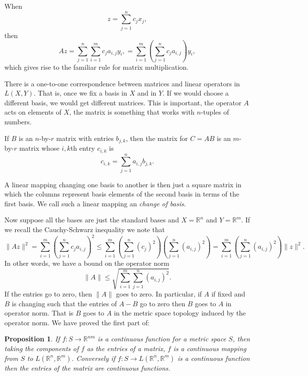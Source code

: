 \documentclass[12pt]{book}
\newcommand{\snorm}[1]{\lVert {#1} \rVert}
\newcommand{\R}{{\mathbb{R}}}
\newcommand{\myindex}[1]{#1\index{#1}}
\theoremstyle{plain}
\newtheorem{prop}[thm]{Proposition}
\theoremstyle{remark}
\theoremstyle{definition}
\theoremstyle{exercise}
\theoremstyle{example}
\begin{document}
When
\begin{equation*}
z = \sum_{j=1}^n c_j x_j ,
\end{equation*}
then
\begin{equation*}
A z =
\sum_{j=1}^n \sum_{i=1}^m c_j a_{i,j} y_i ,
=
\sum_{i=1}^m \left(\sum_{j=1}^n  c_j a_{i,j} \right) y_i ,
\end{equation*}
which gives rise to the familiar rule for matrix multiplication.

There is a one-to-one correspondence between matrices and linear operators in
$L(X,Y)$.  That is, once we fix a basis in $X$ and in $Y$.  If we would
choose a different basis, we would get different matrices.  This is
important, the operator $A$ acts on elements of $X$, the matrix
is something that works with $n$-tuples of numbers.

If $B$ is an $n$-by-$r$ matrix with entries $b_{j,k}$, then 
the matrix for $C = AB$ is an $m$-by-$r$ matrix whose $i,k$th entry
$c_{i,k}$ is
\begin{equation*}
c_{i,k} =
\sum_{j=1}^n a_{i,j}b_{j,k} .
\end{equation*}

A linear mapping changing one basis to another is then just a
square matrix in which the columns represent basis elements
of the second basis in terms of the first basis.  We call such a linear
mapping an \emph{\myindex{change of basis}}.

Now suppose all the bases are just the standard bases and
$X=\R^n$ and $Y=\R^m$. 
If we recall the Cauchy-Schwarz inequality we note
that
\begin{equation*}
\snorm{Az}^2
=
\sum_{i=1}^m { \left(\sum_{j=1}^n c_j a_{i,j} \right)}^2
\leq
\sum_{i=1}^m { \left(\sum_{j=1}^n {(c_j)}^2 \right) \left(\sum_{j=1}^n
{(a_{i,j})}^2 \right) }
=
\sum_{i=1}^m \left(\sum_{j=1}^n {(a_{i,j})}^2 \right)
\snorm{z}^2 .
\end{equation*}
In other words, we have a bound on the operator norm
\begin{equation*}
\snorm{A} \leq
\sqrt{\sum_{i=1}^m \sum_{j=1}^n {(a_{i,j})}^2} .
\end{equation*}
If the entries go to zero, then $\snorm{A}$ goes to zero.  In
particular, if $A$ if fixed and $B$ is changing such
that the entries of $A-B$ go to zero then $B$ goes to $A$
in operator norm.  That is $B$ goes to $A$
in the metric space topology induced by the
operator norm.  We have proved the first part of:

\begin{prop}
If $f \colon S \to \R^{nm}$ is a continuous function
for a metric space $S$,
then taking the components of $f$ as the entries of a matrix,
$f$ is a continuous mapping from $S$
to $L(\R^n,\R^m)$.
Conversely if $f \colon S \to L(\R^n,\R^m)$ is a continuous
function then the entries of the matrix are continuous functions.
\end{prop}
\end{document}
